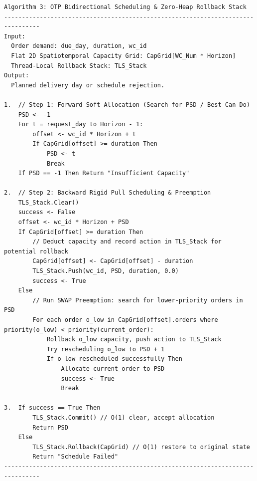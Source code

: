 \documentclass[11pt,a4paper]{article}
\begin{document}
\begin{verbatim}
Algorithm 3: OTP Bidirectional Scheduling & Zero-Heap Rollback Stack
--------------------------------------------------------------------------------
Input:
  Order demand: due_day, duration, wc_id
  Flat 2D Spatiotemporal Capacity Grid: CapGrid[WC_Num * Horizon]
  Thread-Local Rollback Stack: TLS_Stack
Output:
  Planned delivery day or schedule rejection.

1.  // Step 1: Forward Soft Allocation (Search for PSD / Best Can Do)
    PSD <- -1
    For t = request_day to Horizon - 1:
        offset <- wc_id * Horizon + t
        If CapGrid[offset] >= duration Then
            PSD <- t
            Break
    If PSD == -1 Then Return "Insufficient Capacity"

2.  // Step 2: Backward Rigid Pull Scheduling & Preemption
    TLS_Stack.Clear()
    success <- False
    offset <- wc_id * Horizon + PSD
    If CapGrid[offset] >= duration Then
        // Deduct capacity and record action in TLS_Stack for potential rollback
        CapGrid[offset] <- CapGrid[offset] - duration
        TLS_Stack.Push(wc_id, PSD, duration, 0.0)
        success <- True
    Else
        // Run SWAP Preemption: search for lower-priority orders in PSD
        For each order o_low in CapGrid[offset].orders where priority(o_low) < priority(current_order):
            Rollback o_low capacity, push action to TLS_Stack
            Try rescheduling o_low to PSD + 1
            If o_low rescheduled successfully Then
                Allocate current_order to PSD
                success <- True
                Break

3.  If success == True Then
        TLS_Stack.Commit() // O(1) clear, accept allocation
        Return PSD
    Else
        TLS_Stack.Rollback(CapGrid) // O(1) restore to original state
        Return "Schedule Failed"
--------------------------------------------------------------------------------
\end{verbatim}
\end{document}
